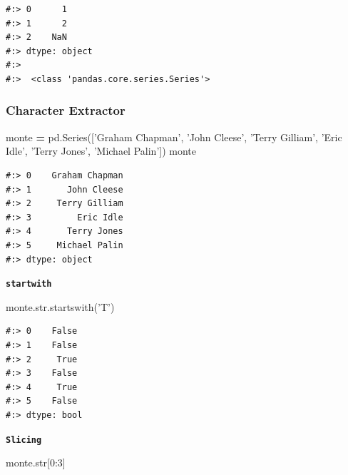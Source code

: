 \documentclass[
]{book}
\newenvironment{Shaded}{\begin{snugshade}}{\end{snugshade}}
\newcommand{\BuiltInTok}[1]{#1}
\newcommand{\DecValTok}[1]{\textcolor[rgb]{0.06,0.06,0.06}{#1}}
\newcommand{\NormalTok}[1]{#1}
\newcommand{\OperatorTok}[1]{\textcolor[rgb]{0.43,0.43,0.43}{\textbf{#1}}}
\newcommand{\StringTok}[1]{\textcolor[rgb]{0.5,0.5,0.5}{#1}}
\begin{document}
\begin{verbatim}
#:> 0      1
#:> 1      2
#:> 2    NaN
#:> dtype: object 
#:> 
#:>  <class 'pandas.core.series.Series'>
\end{verbatim}

\hypertarget{character-extractor}{%
\subsubsection{Character Extractor}\label{character-extractor}}

\begin{Shaded}
\begin{Highlighting}[]
\NormalTok{monte }\OperatorTok{=}\NormalTok{ pd.Series([}\StringTok{'Graham Chapman'}\NormalTok{, }\StringTok{'John Cleese'}\NormalTok{, }\StringTok{'Terry Gilliam'}\NormalTok{,}
                   \StringTok{'Eric Idle'}\NormalTok{, }\StringTok{'Terry Jones'}\NormalTok{, }\StringTok{'Michael Palin'}\NormalTok{])}
\NormalTok{monte}
\end{Highlighting}
\end{Shaded}

\begin{verbatim}
#:> 0    Graham Chapman
#:> 1       John Cleese
#:> 2     Terry Gilliam
#:> 3         Eric Idle
#:> 4       Terry Jones
#:> 5     Michael Palin
#:> dtype: object
\end{verbatim}

\textbf{\texttt{startwith}}

\begin{Shaded}
\begin{Highlighting}[]
\NormalTok{monte.}\BuiltInTok{str}\NormalTok{.startswith(}\StringTok{'T'}\NormalTok{)}
\end{Highlighting}
\end{Shaded}

\begin{verbatim}
#:> 0    False
#:> 1    False
#:> 2     True
#:> 3    False
#:> 4     True
#:> 5    False
#:> dtype: bool
\end{verbatim}

\textbf{\texttt{Slicing}}

\begin{Shaded}
\begin{Highlighting}[]
\NormalTok{monte.}\BuiltInTok{str}\NormalTok{[}\DecValTok{0}\NormalTok{:}\DecValTok{3}\NormalTok{]}
\end{Highlighting}
\end{Shaded}
\end{document}
